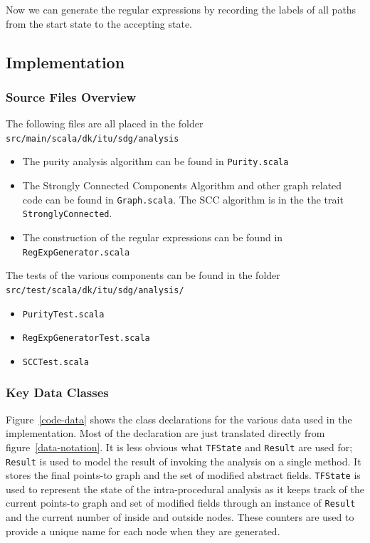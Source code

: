 \documentclass[11pt]{exam}
\begin{document}
Now we can generate the regular expressions by recording the labels of
all paths from the start state to the accepting state.

\subsection{Implementation}

\subsubsection*{Source Files Overview}

The following files are all placed in the folder
\texttt{src/main/scala/dk/itu/sdg/analysis}

\begin{itemize}
  \setlength{\itemsep}{1pt}
  \setlength{\parskip}{0pt}
  \item The purity analysis algorithm can be found in \texttt{Purity.scala}
  \item The Strongly Connected Components Algorithm and other graph related code can be found in \texttt{Graph.scala}. The SCC algorithm is in the the trait \texttt{StronglyConnected}.
  \item The construction of the regular expressions can be
  found in \texttt{RegExpGenerator.scala}
\end{itemize}

The tests of the various components can be found in the folder
\texttt{src/test/scala/dk/itu/sdg/analysis/}

\begin{itemize}
  \setlength{\itemsep}{1pt}
  \setlength{\parskip}{0pt}
  \item \texttt{PurityTest.scala}
  \item \texttt{RegExpGeneratorTest.scala}
  \item \texttt{SCCTest.scala}
\end{itemize}

\subsubsection*{Key Data Classes}

Figure~\ref{code-data} shows the class declarations for the various
data used in the implementation. Most of the  declaration are just
translated directly from figure~\ref{data-notation}. It is less
obvious what \texttt{TFState} and \texttt{Result} are used for;
\texttt{Result} is used to model the result of invoking the analysis on a
single method. It stores the final points-to graph and the set of
modified abstract fields. \texttt{TFState}  is used to represent the
state of the intra-procedural analysis as it  keeps track of the
current points-to graph and set of modified fields through an instance
of \texttt{Result} and the current number of inside and outside
nodes. These counters are used to provide a unique name for each node
when they are generated.
\end{document}
